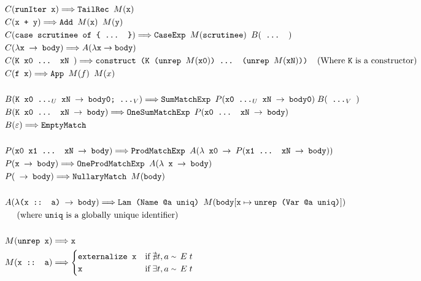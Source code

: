 \documentclass[sigplan,anonymous,review]{acmart}
\newcommand{\expr}[1]{(#1)} %
\newcommand{\rarr}{\rightarrow}
\newcommand{\rewrites}{\Longrightarrow}
\newcommand{\typeeq}{\raise.17ex\hbox{$\scriptstyle\mathtt{\sim}$}\,\;}
\newcommand{\ttt}{\texttt}
\begin{document}
\begin{align*}
  &C\expr{\ttt{runIter x}} \rewrites \ttt{TailRec $M\expr{\ttt{x}}$}\\
  &C\expr{\ttt{x + y}} \rewrites \ttt{Add $M\expr{\ttt{x}}$ $M\expr{\ttt{y}}$}\\
  &C\expr{\ttt{case scrutinee of \{ ... \}}} \rewrites \ttt{CaseExp $M\expr{\ttt{scrutinee}}$ } B\expr{\ttt{ ... }}\\
  &C\expr{\ttt{$\lambda$x $\rarr$ body}} \rewrites A\expr{\lambda \ttt{x} \rarr \ttt{body}}\\
  &C\expr{\ttt{K x0 ... xN }} \rewrites \ttt{construct (K (unrep $M\expr{\ttt{x0}}$) ... (unrep $M\expr{\ttt{xN}}$))}\;\;\;\;\text{(Where \ttt{K} is a constructor)}\\
  &C\expr{\ttt{f x}} \rewrites \ttt{App $M\expr{f}$ $M\expr{x}$}\\
  &\\
  &B\expr{\ttt{K x0 ...$_U$ xN $\rarr$ body0; ...$_V$}} \rewrites \ttt{SumMatchExp }P\expr{\ttt{x0 ...$_U$ xN $\rarr$ body0}}\; B\expr{\ttt{ ...$_V$ }}\\
  &B\expr{\ttt{K x0 ... xN $\rarr$ body}} \rewrites \ttt{OneSumMatchExp }P\expr{\ttt{x0 ... xN $\rarr$ body}}\\
  &B\expr{\ttt{$\varepsilon$}} \rewrites \ttt{EmptyMatch}\\
  &\\
  &P\expr{\ttt{x0 x1 ... xN $\rarr$ body}} \rewrites \ttt{ProdMatchExp }A\expr{\ttt{$\lambda$ x0 $\rarr$ $P\expr{\ttt{x1 ... xN $\rarr$ body}}$}}\\
  &P\expr{\ttt{x $\rarr$ body}} \rewrites \ttt{OneProdMatchExp }A\expr{\ttt{$\lambda$ x $\rarr$ body}}\\
  &P\expr{\ttt{ $\rarr$ body}} \rewrites \ttt{NullaryMatch $M\expr{\ttt{body}}$}\\
  &\\
  &A\expr{\ttt{$\lambda$(x :: a) $\rarr$ body}} \rewrites \ttt{Lam (Name @a uniq) $M\expr{\ttt{body$[\ttt{x} \mapsto \ttt{unrep (Var @a uniq)}]$}}$}\\
  &\text{\;\;\;\;\;(where \ttt{uniq} is a globally unique identifier)}\\
  &\\
  &M\expr{\ttt{unrep x}} \rewrites \ttt{x}\\
  &M\expr{\ttt{x :: a}} \rewrites
    \begin{cases}
      \ttt{externalize x} & \text{if}\; \nexists t, a\; \typeeq E\; t\\
      \ttt{x} & \text{if}\; \exists t, a\; \typeeq E\; t
    \end{cases}
\end{align*}
\end{document}
